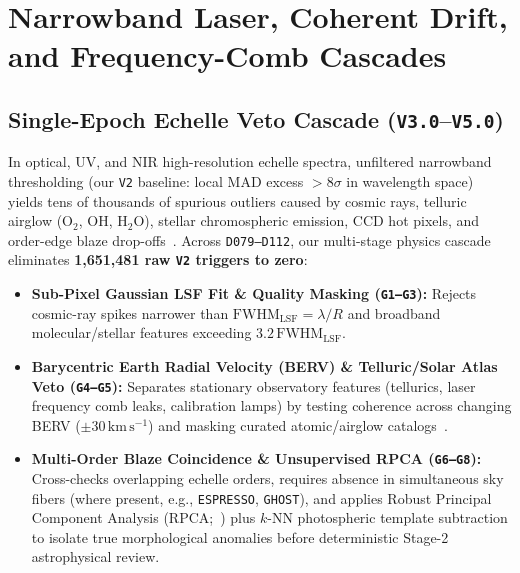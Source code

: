 \documentclass[twocolumn,10pt]{article}
\begin{document}
\section{Narrowband Laser, Coherent Drift, and Frequency-Comb Cascades}
\label{sec:drift_comb}

\subsection{Single-Epoch Echelle Veto Cascade (\texttt{V3.0}--\texttt{V5.0})}
In optical, UV, and NIR high-resolution echelle spectra, unfiltered narrowband thresholding (our \texttt{V2} baseline: local MAD excess $>8\sigma$ in wavelength space) yields tens of thousands of spurious outliers caused by cosmic rays, telluric airglow ($\mathrm{O_2}$, $\mathrm{OH}$, $\mathrm{H_2O}$), stellar chromospheric emission, CCD hot pixels, and order-edge blaze drop-offs~\cite{Rousselot2000,Fuhrmeister2011}. Across \texttt{D079--D112}, our multi-stage physics cascade eliminates \textbf{1,651,481 raw \texttt{V2} triggers to zero}:
\begin{itemize}
  \item \textbf{Sub-Pixel Gaussian LSF Fit \& Quality Masking (\texttt{G1--G3}):} Rejects cosmic-ray spikes narrower than $\mathrm{FWHM}_{\mathrm{LSF}} = \lambda/R$ and broadband molecular/stellar features exceeding $3.2\,\mathrm{FWHM}_{\mathrm{LSF}}$.
  \item \textbf{Barycentric Earth Radial Velocity (BERV) \& Telluric/Solar Atlas Veto (\texttt{G4--G5}):} Separates stationary observatory features (tellurics, laser frequency comb leaks, calibration lamps) by testing coherence across changing BERV ($\pm 30\,\mathrm{km\,s^{-1}}$) and masking curated atomic/airglow catalogs~\cite{Rousselot2000}.
  \item \textbf{Multi-Order Blaze Coincidence \& Unsupervised RPCA (\texttt{G6--G8}):} Cross-checks overlapping echelle orders, requires absence in simultaneous sky fibers (where present, e.g., \texttt{ESPRESSO}, \texttt{GHOST}), and applies Robust Principal Component Analysis (RPCA;~\cite{Candes2011}) plus $k$-NN photospheric template subtraction to isolate true morphological anomalies before deterministic Stage-2 astrophysical review.
\end{itemize}
\end{document}
